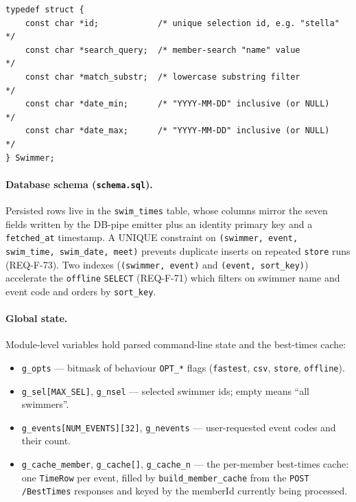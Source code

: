 \documentclass[12pt]{article}
\newcommand{\code}[1]{\texttt{#1}}
\begin{document}
\begin{lstlisting}
typedef struct {
    const char *id;            /* unique selection id, e.g. "stella" */
    const char *search_query;  /* member-search "name" value         */
    const char *match_substr;  /* lowercase substring filter         */
    const char *date_min;      /* "YYYY-MM-DD" inclusive (or NULL)    */
    const char *date_max;      /* "YYYY-MM-DD" inclusive (or NULL)    */
} Swimmer;
\end{lstlisting}

\paragraph{Database schema (\texttt{schema.sql}).}
Persisted rows live in the \texttt{swim\_times} table, whose
columns mirror the seven fields written by the DB-pipe emitter
plus an identity primary key and a \texttt{fetched\_at}
timestamp.  A UNIQUE constraint on
\texttt{(swimmer, event, swim\_time, swim\_date, meet)} prevents
duplicate inserts on repeated \code{store} runs (REQ-F-73).
Two indexes (\texttt{(swimmer, event)} and
\texttt{(event, sort\_key)}) accelerate the \code{offline}
\texttt{SELECT} (REQ-F-71) which filters on swimmer name and
event code and orders by \texttt{sort\_key}.

\paragraph{Global state.}
Module-level variables hold parsed command-line state and the
best-times cache:

\begin{itemize}
  \item \code{g\_opts} --- bitmask of behaviour \code{OPT\_*} flags
        (\code{fastest}, \code{csv}, \code{store}, \code{offline}).
  \item \code{g\_sel[MAX\_SEL]}, \code{g\_nsel} --- selected swimmer
        ids; empty means ``all swimmers''.
  \item \code{g\_events[NUM\_EVENTS][32]}, \code{g\_nevents} ---
        user-requested event codes and their count.
  \item \code{g\_cache\_member}, \code{g\_cache[]}, \code{g\_cache\_n}
        --- the per-member best-times cache: one \code{TimeRow} per
        event, filled by \code{build\_member\_cache} from the
        \code{POST /BestTimes} responses and keyed by the memberId
        currently being processed.
\end{itemize}
\end{document}
